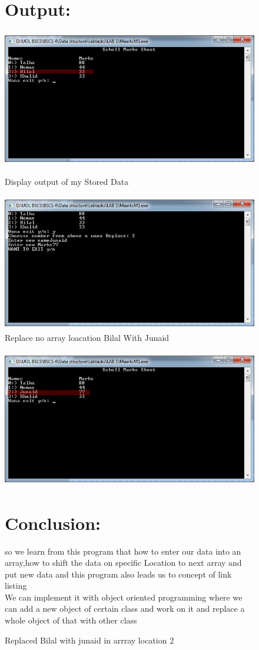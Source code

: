 \documentclass[11pt]{article}            %
\begin{document}
\begin{figure}
\section{Output: }
\centering
  \includegraphics[width=12cm,height=6cm,keepaspectratio]{3.jpg}
\caption{Display output of my Stored Data}
\label{Figure:3}   
 \includegraphics[width=12cm,height=6cm,keepaspectratio]{5.jpg}
\caption{Replace no array loacation Bilal With Junaid}
\label{Figure:4}
\end{figure}
\begin{figure}
 \includegraphics[width=12cm,height=6cm,keepaspectratio]{6.jpg}
\caption{Replaced Bilal with junaid in arrray location 2}
\label{Figure:5}
\section{Conclusion:}  
so we learn from this program that how to enter our data into an array,how to shift the data on specific Location to next array and put new data and this program also leads us to concept of link listing  \\
We can implement  it with object oriented programming where we can add a new object of certain class  and work on it and replace a whole object of that with other class\\
\end{figure}
\end{document}
